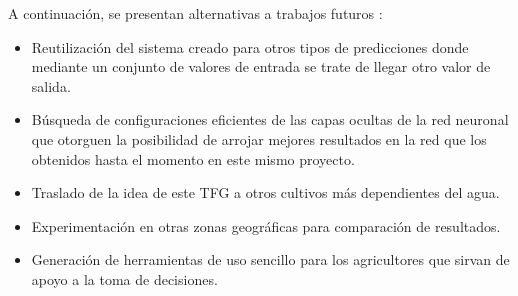 A continuación, se presentan alternativas a trabajos futuros : 
\begin{itemize}

    \item Reutilización del sistema creado para otros tipos de predicciones donde mediante un conjunto de valores de entrada se trate de llegar otro valor de salida.
    \item Búsqueda de configuraciones eficientes de las capas ocultas de la red neuronal que otorguen la posibilidad de arrojar mejores resultados en la red que los obtenidos hasta el momento en este mismo proyecto.
    \item Traslado de la idea de este TFG a otros cultivos más dependientes del agua.
    \item Experimentación en otras zonas geográficas para comparación de resultados.
    \item Generación de herramientas de uso sencillo para los agricultores que sirvan de apoyo a la toma de decisiones.
    
\end{itemize}
